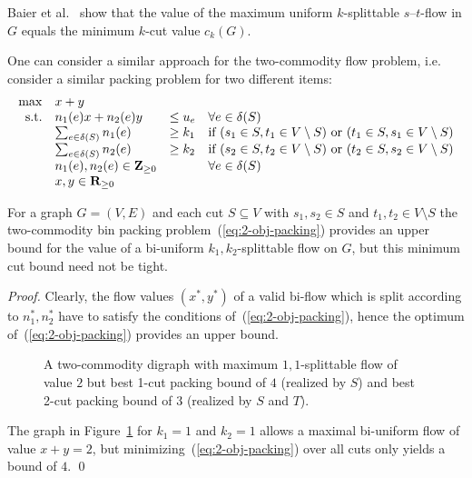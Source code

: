 Baier et al.~\cite{baier-koehler-skutella:05} show that the value of the maximum
uniform $k$-splittable $s$--$t$-flow in $G$ equals the minimum $k$-cut
value $c_k(G)$.

One can consider a similar approach for the two-commodity flow
problem, i.e. consider a similar packing problem for two different
items:
\begin{equation}
  \label{eq:2-obj-packing}
  \begin{array}{rlll}
    \max& x+y\\
    \text{s.t.}&n_1(e)x+n_2(e)y&\leq u_e&\forall e\in\delta(S)\\
               &\sum_{e\in\delta(S)}n_1(e)& \geq k_1&\text{if }(s_1\in
               S,t_1\in V\setminus S)\text{ or }
               (t_1\in S,s_1\in V\setminus S) \\
               &\sum_{e\in\delta(S)}n_2(e)& \geq k_2&\text{if }(s_2\in
               S,t_2\in V\setminus S)\text{ or }
               (t_2\in S,s_2\in V\setminus S) \\
               &n_1(e),n_2(e)\in\mathbf{Z}_{\geq0}&&\forall e\in\delta(S)\\
               &x,y\in\mathbf{R}_{\geq0}               
  \end{array}
\end{equation}

\begin{proposition}\label{prop:ck1k2-bound}
  For a graph $G=(V,E)$ and each cut $S\subseteq V$ with
  $s_1,s_2\in S$ and $t_1,t_2\in V\setminus S$ the
  two-commodity bin packing problem~(\ref{eq:2-obj-packing}) provides
  an upper bound for the value of a bi-uniform $k_1,k_2$-splittable
  flow on $G$, but this minimum cut bound need not be tight.
\end{proposition}


\begin{proof}
  Clearly, the flow values $(x^*,y^*)$ of a valid bi-flow which is
  split according to $n_1^*,n_2^*$ have to satisfy the conditions
  of~(\ref{eq:2-obj-packing}), hence the optimum
  of~(\ref{eq:2-obj-packing}) provides an upper bound.

  
  \begin{figure}
    \centering
    \caption{A two-commodity digraph with maximum $1,1$-splittable
      flow of value $2$ but best 1-cut packing bound of $4$ (realized
      by $S$) and best 2-cut packing bound of $3$ (realized by $S$ and
      $T$).}
    \label{fig:packing-bound-gap}
  \end{figure}
  The graph in Figure~\ref{fig:packing-bound-gap} for $k_1=1$ and
  $k_2=1$ allows a maximal bi-uniform flow of value $x+y=2$, but
  minimizing~(\ref{eq:2-obj-packing}) over all cuts only yields a
  bound of $4$.
\qed \end{proof}

